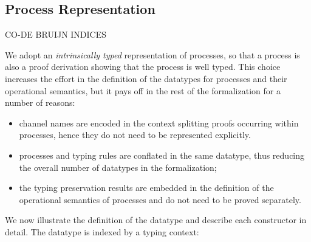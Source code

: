 \subsection{Process Representation}
\label{sec:process-agda}

CO-DE BRUIJN INDICES

We adopt an \emph{intrinsically typed} representation of processes, so that a
process is also a proof derivation showing that the process is well typed. This
choice increases the effort in the definition of the datatypes for processes and
their operational semantics, but it pays off in the rest of the formalization
for a number of reasons:

\begin{itemize}
\item channel names are encoded in the context splitting proofs occurring within
  processes, hence they do not need to be represented explicitly.
\item processes and typing rules are conflated in the same datatype, thus
  reducing the overall number of datatypes in the formalization;
\item the typing preservation results are embedded in the definition of the
  operational semantics of processes and do not need to be proved separately.
\end{itemize}

We now illustrate the definition of the  datatype and
describe each constructor in detail. The datatype is indexed by a typing
context:

